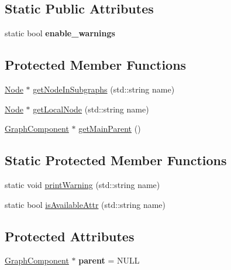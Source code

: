 \subsection*{Static Public Attributes}
\begin{DoxyCompactItemize}
\item 
static bool {\bfseries enable\+\_\+warnings}\hypertarget{classmemgraph_1_1_graph_component_ab7dc52b25be2c4d069ab8a45121d255c}{}\label{classmemgraph_1_1_graph_component_ab7dc52b25be2c4d069ab8a45121d255c}

\end{DoxyCompactItemize}
\subsection*{Protected Member Functions}
\begin{DoxyCompactItemize}
\item 
\hyperlink{classmemgraph_1_1_node}{Node} $\ast$ \hyperlink{classmemgraph_1_1_graph_component_a3357a80b74e240524a9c99cd4ff004b6}{get\+Node\+In\+Subgraphs} (std\+::string name)
\item 
\hyperlink{classmemgraph_1_1_node}{Node} $\ast$ \hyperlink{classmemgraph_1_1_graph_component_a6e77a9395837b9042b6eccfd9f9248d4}{get\+Local\+Node} (std\+::string name)
\item 
\hyperlink{classmemgraph_1_1_graph_component}{Graph\+Component} $\ast$ \hyperlink{classmemgraph_1_1_graph_component_a7c09671e13154de9992deb635804679d}{get\+Main\+Parent} ()
\end{DoxyCompactItemize}
\subsection*{Static Protected Member Functions}
\begin{DoxyCompactItemize}
\item 
static void \hyperlink{classmemgraph_1_1_graph_component_ac4fbe6d155cc80c81283254a2211eead}{print\+Warning} (std\+::string name)
\item 
static bool \hyperlink{classmemgraph_1_1_graph_component_adc5c79c5131d0fa85268efcacca475e6}{is\+Available\+Attr} (std\+::string name)
\end{DoxyCompactItemize}
\subsection*{Protected Attributes}
\begin{DoxyCompactItemize}
\item 
\hyperlink{classmemgraph_1_1_graph_component}{Graph\+Component} $\ast$ {\bfseries parent} = N\+U\+LL\hypertarget{classmemgraph_1_1_graph_component_a643bfc3e22699e83083aae6a4659687a}{}\label{classmemgraph_1_1_graph_component_a643bfc3e22699e83083aae6a4659687a}

\end{DoxyCompactItemize}
